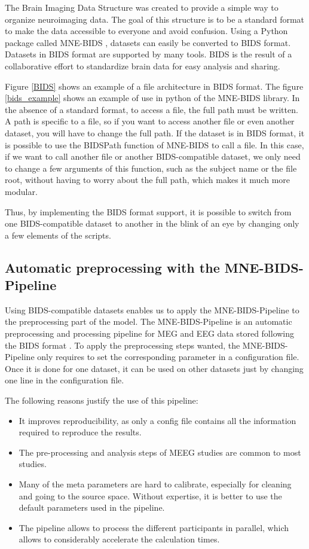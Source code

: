 The Brain Imaging Data Structure was created to provide a simple way to organize neuroimaging data. The goal of this structure is to be a standard format to make the data accessible to everyone and avoid confusion. Using a Python package called MNE-BIDS \cite{appelhoff2019mne}, datasets can easily be converted to BIDS format. Datasets in BIDS format are supported by many tools. BIDS is the result of a collaborative effort to standardize brain data for easy analysis and sharing.

Figure \ref{BIDS} shows an example of a file architecture in BIDS format. The figure \ref{bids_example} shows an example of use in python of the MNE-BIDS library. In the absence of a standard format, to access a file, the full path must be written. A path is specific to a file, so if you want to access another file or even another dataset, you will have to change the full path. If the dataset is in BIDS format, it is possible to use the BIDSPath function of MNE-BIDS to call a file. In this case, if we want to call another file or another BIDS-compatible dataset, we only need to change a few arguments of this function, such as the subject name or the file root, without having to worry about the full path, which makes it much more modular.

Thus, by implementing the BIDS format support, it is possible to switch from one BIDS-compatible dataset to another in the blink of an eye by changing only a few elements of the scripts.

\subsection{Automatic preprocessing with the MNE-BIDS-Pipeline}

Using BIDS-compatible datasets enables us to apply the MNE-BIDS-Pipeline to the preprocessing part of the model. The MNE-BIDS-Pipeline is an automatic preprocessing and processing pipeline for MEG and EEG data stored following the BIDS format \cite{gorgolewski2016brain}. To apply the preprocessing steps wanted, the MNE-BIDS-Pipeline only requires to set the corresponding parameter in a configuration file. Once it is done for one dataset, it can be used on other datasets just by changing one line in the configuration file.

The following reasons justify the use of this pipeline:
\begin{itemize}
   \item It improves reproducibility, as only a config file contains all the information required to reproduce the results.
   \item The pre-processing and analysis steps of MEEG studies are common to most studies.
   \item Many of the meta parameters are hard to calibrate, especially for cleaning and going to the source space. Without expertise, it is better to use the default parameters used in the pipeline.
   \item The pipeline allows to process the different participants in parallel, which allows to considerably accelerate the calculation times.
\end{itemize}
